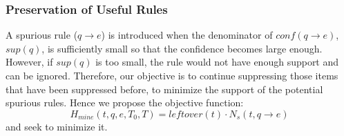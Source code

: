 %

\subsubsection{Preservation of Useful Rules}

A spurious rule ($q \rightarrow e$) is introduced when
the denominator of $conf(q \rightarrow e)$, $sup(q)$,
is sufficiently small so that the confidence becomes large enough.
However, if $sup(q)$ is too small, the rule would not have enough
support and can be ignored.
Therefore, our objective is to continue suppressing
those items that have been suppressed before,
to minimize the support of the potential spurious rules.
Hence we propose the objective function:
\begin{equation}\label{eq:hmine}
H_{mine}(t, q, e, T_0, T)=leftover(t)\cdot N_s(t, q\rightarrow e)
\end{equation}
and seek to minimize it.

